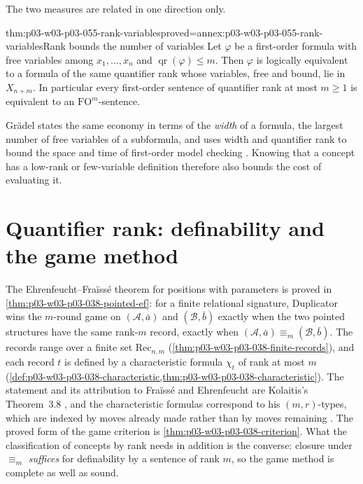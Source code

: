 The two measures are related in one direction only.

\begin{hblemma}{thm:p03-w03-p03-055-rank-variables}{proved=annex:p03-w03-p03-055-rank-variables}{Rank bounds the number of variables}
Let \(\varphi\) be a first-order formula with free variables among
\(x_1,\ldots,x_n\) and \(\operatorname{qr}(\varphi)\le m\). Then
\(\varphi\) is logically equivalent to a formula of the same quantifier
rank whose variables, free and bound, lie in \(X_{n+m}\). In particular
every first-order sentence of quantifier rank at most \(m\ge1\) is
equivalent to an \(\mathrm{FO}^m\)-sentence.
\end{hblemma}

Gr\"adel states the same economy in terms of the \emph{width} of a formula,
the largest number of free variables of a subformula, and uses width and
quantifier rank to bound the space and time of first-order model checking
\cite[Lemma~3.1.4 and Thm.~3.1.5, p.~133]{Gradel2007FMTDescriptiveChapter}.
Knowing that a concept has a low-rank or few-variable definition therefore
also bounds the cost of evaluating it.

\section{Quantifier rank: definability and the game method}
\label{sec:p03-w03-p03-055-ef}

The Ehrenfeucht--Fra\"iss\'e theorem for positions with parameters is
proved in \cref{thm:p03-w03-p03-038-pointed-ef}: for a finite relational
signature, Duplicator wins the \(m\)-round game on \((\mathcal A,\bar a)\)
and \((\mathcal B,\bar b)\) exactly when the two pointed structures have the
same rank-\(m\) record, exactly when
\((\mathcal A,\bar a)\equiv_m(\mathcal B,\bar b)\). The records range over a
finite set \(\mathrm{Rec}_{n,m}\)
(\cref{thm:p03-w03-p03-038-finite-records}), and each record \(t\) is
defined by a characteristic formula \(\chi_t\) of rank at most \(m\)
(\cref{def:p03-w03-p03-038-characteristic,thm:p03-w03-p03-038-characteristic}).
The statement and its attribution to Fra\"iss\'e and Ehrenfeucht are
Kolaitis's Theorem~3.8 \cite[p.~11]{Kolaitis2003ExpressivePowerNotes}, and
the characteristic formulas correspond to his \((m,r)\)-types, which are
indexed by moves already made rather than by moves remaining
\cite[Def.~3.11 and Lemma~3.12, pp.~12--13]{Kolaitis2003ExpressivePowerNotes}.
The proved form of the game criterion is
\cref{thm:p03-w03-p03-038-criterion}. What the classification of concepts
by rank needs in addition is the converse: closure under \(\equiv_m\)
\emph{suffices} for definability by a sentence of rank \(m\), so the game
method is complete as well as sound.

